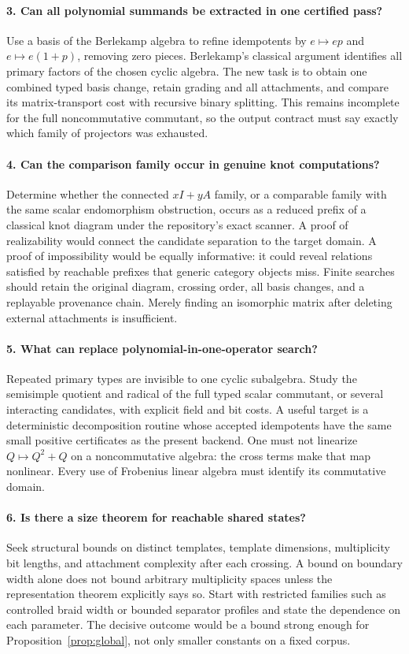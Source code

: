 \documentclass[11pt,a4paper]{article}
\theoremstyle{definition}\newtheorem{definition}[theorem]{Definition}
\theoremstyle{remark}\newtheorem{remark}[theorem]{Remark}
\begin{document}
\paragraph{3. Can all polynomial summands be extracted in one certified pass?}
Use a basis of the Berlekamp algebra to refine idempotents by $e\mapsto ep$
and $e\mapsto e(1+p)$, removing zero pieces. Berlekamp's classical argument
identifies all primary factors of the chosen cyclic algebra. The new task
is to obtain one combined typed basis change, retain grading and all
attachments, and compare its matrix-transport cost with recursive binary
splitting. This remains incomplete for the full noncommutative commutant,
so the output contract must say exactly which family of projectors was
exhausted.

\paragraph{4. Can the comparison family occur in genuine knot computations?}
Determine whether the connected $xI+yA$ family, or a comparable family with
the same scalar endomorphism obstruction, occurs as a reduced prefix of a
classical knot diagram under the repository's exact scanner. A proof of
realizability would connect the candidate separation to the target domain.
A proof of impossibility would be equally informative: it could reveal
relations satisfied by reachable prefixes that generic category objects
miss. Finite searches should retain the original diagram, crossing order,
all basis changes, and a replayable provenance chain. Merely finding an
isomorphic matrix after deleting external attachments is insufficient.

\paragraph{5. What can replace polynomial-in-one-operator search?}
Repeated primary types are invisible to one cyclic subalgebra. Study the
semisimple quotient and radical of the full typed scalar commutant, or
several interacting candidates, with explicit field and bit costs. A useful
target is a deterministic decomposition routine whose accepted idempotents
have the same small positive certificates as the present backend. One
must not linearize $Q\mapsto Q^2+Q$ on a noncommutative algebra: the cross
terms make that map nonlinear. Every use of Frobenius linear algebra must
identify its commutative domain.

\paragraph{6. Is there a size theorem for reachable shared states?}
Seek structural bounds on distinct templates, template dimensions,
multiplicity bit lengths, and attachment complexity after each crossing.
A bound on boundary width alone does not bound arbitrary multiplicity
spaces unless the representation theorem explicitly says so. Start with
restricted families such as controlled braid width or bounded separator
profiles and state the dependence on each parameter. The decisive outcome
would be a bound strong enough for Proposition~\ref{prop:global}, not only
smaller constants on a fixed corpus.
\end{document}
